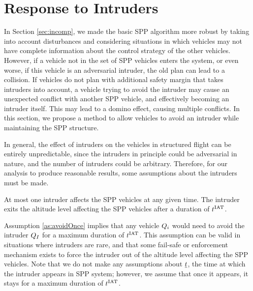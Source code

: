 \section{Response to Intruders \label{sec:intruder}}
In Section \ref{sec:incomp}, we made the basic SPP algorithm more robust by taking into account disturbances and considering situations in which vehicles may not have complete information about the control strategy of the other vehicles. However, if a vehicle not in the set of SPP vehicles enters the system, or even worse, if this vehicle is an adversarial intruder, the old plan can lead to a collision. If vehicles do not plan with additional safety margin that takes intruders into account, a vehicle trying to avoid the intruder may cause an unexpected conflict with another SPP vehicle, and effectively becoming an intruder itself. This may lead to a domino effect, causing multiple conflicts. In this section, we propose a method to allow vehicles to avoid an intruder while maintaining the SPP structure. 

In general, the effect of intruders on the vehicles in structured flight can be entirely unpredictable, since the intruders in principle could be adversarial in nature, and the number of intruders could be arbitrary. Therefore, for our analysis to produce reasonable results, some assumptions about the intruders must be made.

\begin{assumption}
\label{as:avoidOnce}
At most one intruder affects the SPP vehicles at any given time. The intruder exits the altitude level affecting the SPP vehicles after a duration of $t^\text{IAT}$. 
\end{assumption}

Assumption \ref{as:avoidOnce} implies that any vehicle $Q_i$ would need to avoid the intruder $Q_{I}$ for a maximum duration of $t^\text{IAT}$. This assumption can be valid in situations where intruders are rare, and that some fail-safe or enforcement mechanism exists to force the intruder out of the altitude level affecting the SPP vehicles. Note that we do not make any assumptions about $\underline{t}$, the time at which the intruder appears in SPP system; however, we assume that once it appears, it stays for a maximum duration of $t^\text{IAT}$.

